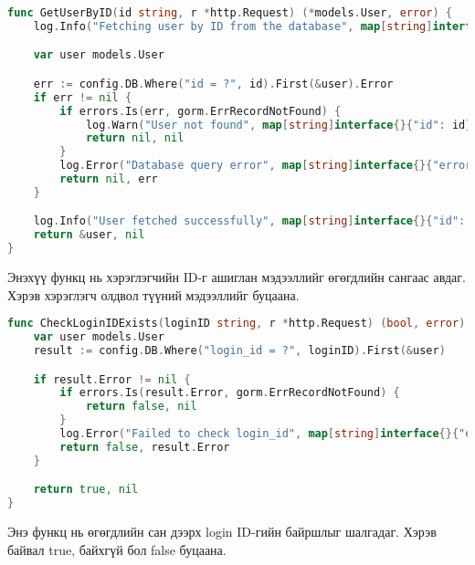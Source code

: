 \begin{lstlisting}[language=Go, caption=Get user by ID function, frame=single]
func GetUserByID(id string, r *http.Request) (*models.User, error) {
	log.Info("Fetching user by ID from the database", map[string]interface{}{"id": id}, r)

	var user models.User

	err := config.DB.Where("id = ?", id).First(&user).Error
	if err != nil {
		if errors.Is(err, gorm.ErrRecordNotFound) {
			log.Warn("User not found", map[string]interface{}{"id": id}, r)
			return nil, nil
		}
		log.Error("Database query error", map[string]interface{}{"error": err.Error()}, r)
		return nil, err
	}

	log.Info("User fetched successfully", map[string]interface{}{"id": id}, r)
	return &user, nil
}
\end{lstlisting}

Энэхүү функц нь хэрэглэгчийн ID-г ашиглан мэдээллийг өгөгдлийн сангаас авдаг. Хэрэв хэрэглэгч олдвол түүний мэдээллийг буцаана.

\begin{lstlisting}[language=Go, caption=Check if login ID exists function, frame=single]
func CheckLoginIDExists(loginID string, r *http.Request) (bool, error) {
	var user models.User
	result := config.DB.Where("login_id = ?", loginID).First(&user)

	if result.Error != nil {
		if errors.Is(result.Error, gorm.ErrRecordNotFound) {
			return false, nil
		}
		log.Error("Failed to check login_id", map[string]interface{}{"error": result.Error.Error()}, r)
		return false, result.Error 
	}

	return true, nil 
}
\end{lstlisting}

Энэ функц нь өгөгдлийн сан дээрх login ID-гийн байршлыг шалгадаг. Хэрэв байвал true, байхгүй бол false буцаана.
\pagebreak
